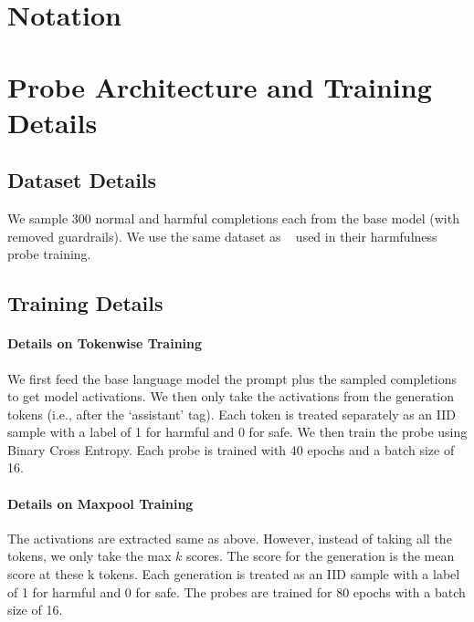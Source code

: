 


\section{Notation}
\label{sec:notation}


\section{Probe Architecture and Training Details}
\label{sec:probe_training}
\subsection{Dataset Details}
We sample 300 normal and harmful completions each from the base model (with removed guardrails). We use the same dataset as ~\citet{bailey2024obfuscated} used in their harmfulness probe training. 

\subsection{Training Details}
\paragraph{Details on Tokenwise Training}
We first feed the base language model the prompt plus the sampled completions to get model activations. We then only take the activations from the generation tokens (i.e., after the `assistant' tag). Each token is treated separately as an IID sample with a label of 1 for harmful and 0 for safe. We then train the probe using Binary Cross Entropy. Each probe is trained with 40 epochs and a batch size of 16. 

\paragraph{Details on Maxpool Training}
The activations are extracted same as above. However, instead of taking all the tokens, we only take the max $k$ scores. The score for the generation is the mean score at these k tokens. Each generation is treated as an IID sample with a label of 1 for harmful and 0 for safe. The probes are trained for 80 epochs with a batch size of 16. 

